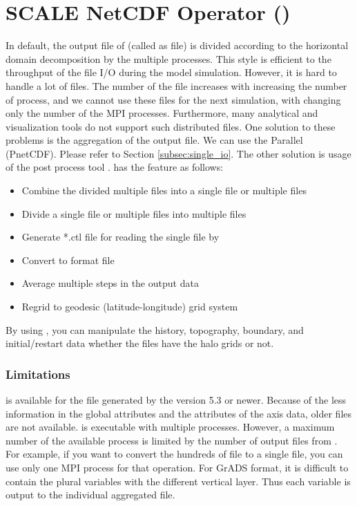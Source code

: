 \section{SCALE NetCDF Operator (\sno)} \label{sec:snoutil}

In default, the output file of \scalerm (called as \scalenetcdf file) is divided according to the horizontal domain decomposition by the multiple processes. This style is efficient to the throughput of the file I/O during the model simulation. However, it is hard to handle a lot of files. The number of the file increases with increasing the number of process, and we cannot use these files for the next simulation, with changing only the number of the MPI processes. Furthermore, many analytical and visualization tools do not support such distributed files. One solution to these problems is the aggregation of the output file. We can use the Parallel \netcdf (PnetCDF). Please refer to Section \ref{subsec:single_io}. The other solution is usage of the post process tool \sno. \sno has the feature as follows:

\begin{itemize}
 \item Combine the divided multiple files into a single file or multiple files
 \item Divide a single file or multiple files into multiple files
 \item Generate *.ctl file for reading the single \Netcdf file by \grads
 \item Convert to \grads format file
 \item Average multiple steps in the output data
 \item Regrid to geodesic (latitude-longitude) grid system
\end{itemize}

By using \sno, you can manipulate the history, topography, boundary, and initial/restart data whether the files have the halo grids or not.

\subsubsection{Limitations}

\sno is available for the \scalenetcdf file generated by the \scalelib version 5.3 or newer. Because of the less information in the global attributes and the attributes of the axis data, older \scalenetcdf files are not available.
\sno is executable with multiple processes. However, a maximum number of the available process is limited by the number of output files from \sno. For example, if you want to convert the hundreds of \scalenetcdf file to a single file, you can use only one MPI process for that operation.
For GrADS format, it is difficult to contain the plural variables with the different vertical layer. Thus each variable is output to the individual aggregated file.

